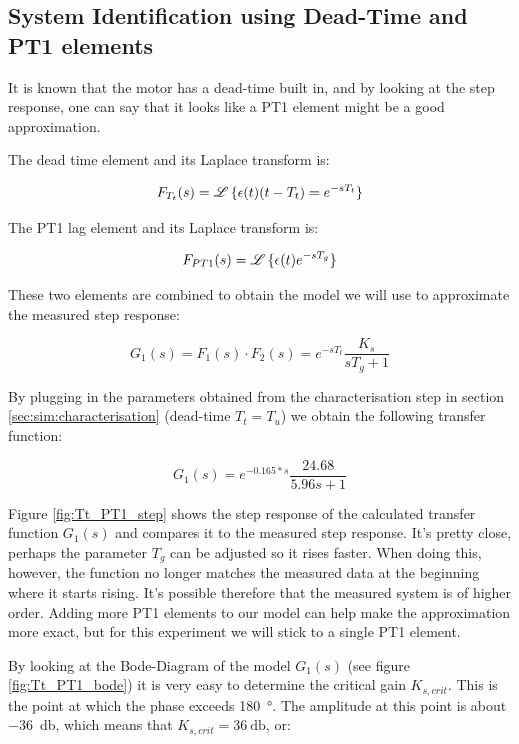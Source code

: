 \subsection{System Identification using Dead-Time and PT1 elements}
\label{sec:ident_Tt_PT1}

It  is  known  that the motor has a dead-time built in, and by looking at  the
step  response, one can say that it looks like a PT1 element might be  a  good
approximation.

The dead time element and its Laplace transform is:

\begin{equation}
    F_{T_t}(s) = \operatorname{\mathscr{L}}{\{\epsilon(t)(t-T_t)} = e^{-sT_t}\}
\end{equation}

The PT1 lag element and its Laplace transform is:

\begin{equation}
    F_{PT1}(s) = \operatorname{\mathscr{L}}{\{\epsilon(t)e^{-sT_g}}\}
\end{equation}

These two elements are combined to obtain the model we will use to approximate
the measured step response:

\begin{equation}
    G_1(s) = F_1(s) \cdot F_2(s) = e^{-sT_t} \frac{K_s}{sT_g+1}
\end{equation}

By  plugging  in  the  parameters  obtained  from the characterisation step in
section  \ref{sec:sim:characterisation}  (dead-time  $T_t=T_u$)  we obtain the
following transfer function:

\begin{equation}
    G_1(s) = e^{-0.165*s}\frac{24.68}{5.96s + 1}
\end{equation}

Figure  \ref{fig:Tt_PT1_step}  shows  the  step  response  of  the  calculated
transfer function $G_1(s)$ and compares it to the measured step response. It's
pretty  close, perhaps the parameter $T_g$ can be adjusted so it rises faster.
When doing this, however, the function no longer matches  the measured data at
the  beginning  where  it  starts  rising.  It's  possible therefore that  the
measured system  is of higher order. Adding more PT1 elements to our model can
help make the approximation more  exact, but for this experiment we will stick
to a single PT1 element.

By  looking  at  the  Bode-Diagram  of  the   model   $G_1(s)$   (see   figure
\ref{fig:Tt_PT1_bode})  it  is  very  easy  to  determine  the  critical  gain
$K_{s,crit}$. This is the  point at which the phase exceeds \SI{180}{\degree}.
The amplitude at  this  point  is  about  \SI{-36}{\decibel}, which means that
$K_{s,crit}=\SI{36}{\decibel}$, or:

